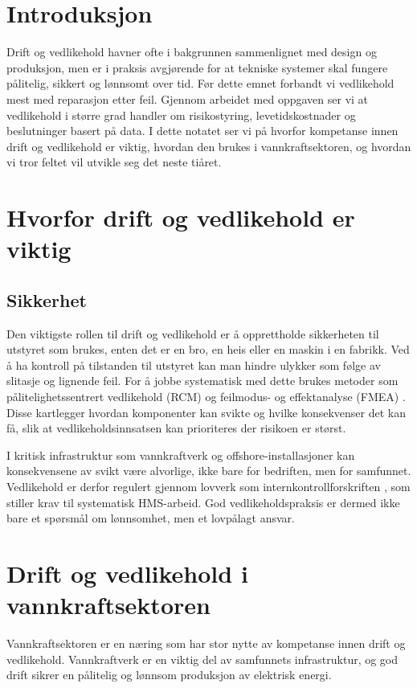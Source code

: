 \section*{Introduksjon}
Drift og vedlikehold havner ofte i bakgrunnen sammenlignet med design og produksjon, men er i praksis avgjørende for at tekniske systemer skal fungere pålitelig, sikkert og lønnsomt over tid. Før dette emnet forbandt vi vedlikehold mest med reparasjon etter feil. Gjennom arbeidet med oppgaven ser vi at vedlikehold i større grad handler om risikostyring, levetidskostnader og beslutninger basert på data. I dette notatet ser vi på hvorfor kompetanse innen drift og vedlikehold er viktig, hvordan den brukes i vannkraftsektoren, og hvordan vi tror feltet vil utvikle seg det neste tiåret.

\section*{Hvorfor drift og vedlikehold er viktig}

\subsection*{Sikkerhet}
Den viktigste rollen til drift og vedlikehold er å opprettholde sikkerheten til utstyret som brukes, enten det er en bro, en heis eller en maskin i en fabrikk. Ved å ha kontroll på tilstanden til utstyret kan man hindre ulykker som følge av slitasje og lignende feil. For å jobbe systematisk med dette brukes metoder som pålitelighetssentrert vedlikehold (RCM) \parencite{saeja1011} og feilmodus- og effektanalyse (FMEA) \parencite{iec60812}. Disse kartlegger hvordan komponenter kan svikte og hvilke konsekvenser det kan få, slik at vedlikeholdsinnsatsen kan prioriteres der risikoen er størst.

I kritisk infrastruktur som vannkraftverk og offshore-installasjoner kan konsekvensene av svikt være alvorlige, ikke bare for bedriften, men for samfunnet. Vedlikehold er derfor regulert gjennom lovverk som internkontrollforskriften \parencite{internkontrollforskriften}, som stiller krav til systematisk HMS-arbeid. God vedlikeholdspraksis er dermed ikke bare et spørsmål om lønnsomhet, men et lovpålagt ansvar.

\section*{Drift og vedlikehold i vannkraftsektoren}
Vannkraftsektoren er en næring som har stor nytte av kompetanse innen drift og vedlikehold. Vannkraftverk er en viktig del av samfunnets infrastruktur, og god drift sikrer en pålitelig og lønnsom produksjon av elektrisk energi.

